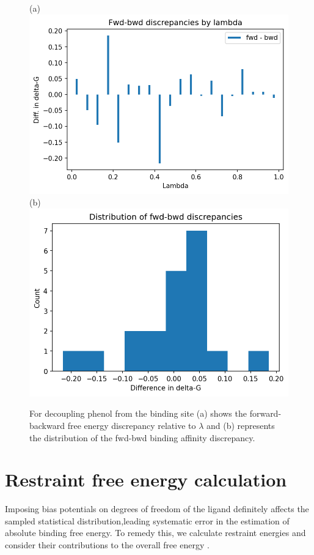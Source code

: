 \documentclass[9pt,tutorial]{livecoms}
\begin{document}
\begin{figure}[h!t]
\centering
(a)
\includegraphics[width=0.8\linewidth]{Supp-Files/AFEP-Bound-Decoupling/output/Alchemlyb/output_14_1.png}
\\
\centering
(b)
\includegraphics[width=0.8\linewidth]{Supp-Files/AFEP-Bound-Decoupling/output/Alchemlyb/output_16_1.png}
\caption{ For decoupling phenol from the binding site (a) shows the forward-backward free energy discrepancy relative to {$\lambda$} and (b) represents the distribution of the fwd-bwd binding affinity discrepancy.}
\label{fig:AFEP-decoupl3}
\end{figure}

\section{Restraint free energy calculation}\label{sec:10}
Imposing bias potentials on degrees of freedom of the ligand definitely affects the sampled statistical distribution,leading systematic error in the estimation of absolute binding free energy. To remedy this, we calculate restraint energies and consider their contributions to the overall free energy \cite{Henin2014,Fu2017}.
\end{document}
